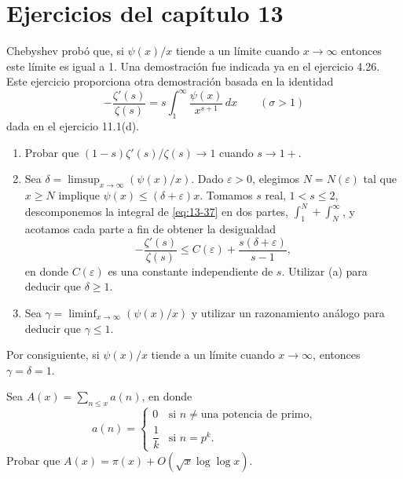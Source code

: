     \section*{Ejercicios del capítulo 13}

    \begin{ejercicio}
        Chebyshev probó que, si $\psi(x)/x$ tiende a un límite cuando $x\to\infty$ entonces este
        límite es igual a 1. Una demostración fue indicada ya en el ejercicio 4.26. Este
        ejercicio proporciona otra demostración basada en la identidad
        \begin{equation}\label{eq:13-37}
            -\frac{\zeta'(s)}{\zeta(s)}=s\int_1^{\infty}\frac{\psi(x)}{x^{s+1}}\,dx\qquad(\sigma>1)
        \end{equation}
        dada en el ejercicio 11.1(d).
        \begin{enumerate}
            \item[(a)] Probar que $(1-s)\zeta'(s)/\zeta(s)\to1$ cuando $s\to1+$.
            \item[(b)] Sea $\delta=\limsup_{x\to\infty}(\psi(x)/x)$. Dado $\varepsilon>0$,
            elegimos $N=N(\varepsilon)$ tal que $x\geq N$ implique
            $\psi(x)\leq(\delta+\varepsilon)x$. Tomamos $s$ real, $1<s\leq2$, descomponemos la
            integral de \eqref{eq:13-37} en dos partes, $\int_1^N+\int_N^{\infty}$, y acotamos
            cada parte a fin de obtener la desigualdad
            \begin{equation*}
                -\frac{\zeta'(s)}{\zeta(s)}\leq C(\varepsilon)+\frac{s(\delta+\varepsilon)}{s-1},
            \end{equation*}
            en donde $C(\varepsilon)$ es una constante independiente de $s$. Utilizar (a) para
            deducir que $\delta\geq1$.
            \item[(c)] Sea $\gamma=\liminf_{x\to\infty}(\psi(x)/x)$ y utilizar un razonamiento
            análogo para deducir que $\gamma\leq1$.
        \end{enumerate}
        Por consiguiente, si $\psi(x)/x$ tiende a un límite cuando $x\to\infty$, entonces
        $\gamma=\delta=1$.
    \end{ejercicio}

    \begin{ejercicio}
        Sea $A(x)=\sum_{n\leq x}a(n)$, en donde
        \begin{equation*}
            a(n)=
            \begin{cases}
                0&\text{si }n\neq\text{una potencia de primo,}\\
                \dfrac{1}{k}&\text{si }n=p^k.
            \end{cases}
        \end{equation*}
        Probar que $A(x)=\pi(x)+O(\sqrt{x}\log\log x)$.
    \end{ejercicio}

